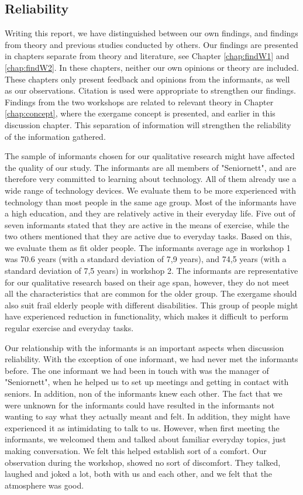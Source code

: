 \subsection{Reliability}
Writing this report, we have distinguished between our own findings, and findings from theory and previous studies conducted by others. Our findings are presented in chapters separate from theory and literature, see Chapter \ref{chap:findW1} and \ref{chap:findW2}. In these chapters, neither our own opinions or theory are included. These chapters only present feedback and opinions from the informants, as well as our observations. Citation is used were appropriate to strengthen our findings.  Findings from the two workshops are related to relevant theory in Chapter \ref{chap:concept}, where the exergame concept is presented, and earlier in this discussion chapter. This separation of information will strengthen the reliability of the information gathered.

The sample of informants chosen for our qualitative research might have affected the quality of our study. The informants are all members of "Seniornett", and are therefore very committed to learning about technology. All of them already use a wide range of technology devices. We evaluate them to be more experienced with technology than most people in the same age group. Most of the informants have a high education, and they are relatively active in their everyday life. Five out of seven informants stated that they are active in the means of exercise, while the two others mentioned that they are active due to everyday tasks. Based on this, we evaluate them as fit older people. The informants average age in workshop 1 was 70.6 years (with a standard deviation of 7,9 years), and 74,5 years (with a standard deviation of 7,5 years) in workshop 2. The informants are representative for our qualitative research based on their age span, however, they do not meet all the characteristics that are common for the older group. The exergame should also suit frail elderly people with different disabilities. This group of people might have experienced reduction in functionality, which makes it difficult to perform regular exercise and everyday tasks. 

Our relationship with the informants is an important aspects when discussion reliability. With the exception of one informant, we had never met the informants before. The one informant we had been in touch with was the manager of "Seniornett", when he helped us to set up meetings and getting in contact with seniors. In addition, non of the informants knew each other. The fact that we were unknown for the informants could have resulted in the informants not wanting to say what they actually meant and felt. In addition, they might have experienced it as intimidating to talk to us. However, when first meeting the informants, we welcomed them and talked about familiar everyday topics, just making conversation. We felt this helped establish sort of a comfort. Our observation during the workshop, showed no sort of discomfort. They talked, laughed and joked a lot, both with us and each other, and we felt that the atmosphere was good. 

